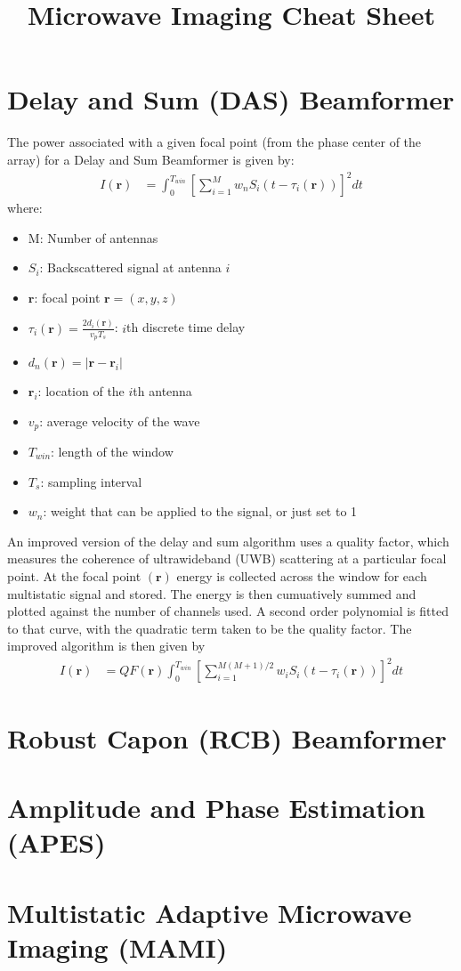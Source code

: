 \documentclass[14pt]{article}
\title{Microwave Imaging Cheat Sheet}
\begin{document}
	\maketitle
		
		\section*{Delay and Sum (DAS) Beamformer}	
			The power associated with a given focal point (from the phase center of 
			the array) for a Delay and Sum Beamformer is given by:
			\begin{align}
				I(\bm{r}) &= \int_0^{T_{win}} [ \sum_{i=1}^M w_n S_i(t - \tau_i(\bm{r}))]^2 dt
			\end{align}
			where:
				\begin{itemize}
					\item	M:	Number of antennas
					\item	$S_i$:	Backscattered signal at antenna $i$
					\item	$\bm{r}$:	focal point $\bm{r} = (x,y,z)$	
					\item	$\tau_i(\bm{r}) = \frac{2d_i(\bm{r})}{v_p T_s}$:	$i$th discrete time delay
					\item	$d_n(\bm{r}) = |\bm{r} - \bm{r}_i|$
					\item	$\bm{r}_i$:	location of the $i$th antenna
					\item	$v_p$:	average velocity of the wave 
					\item	$T_{win}$:	length of the window
					\item	$T_s$:	sampling interval
					\item	$w_n$:	weight that can be applied to the signal, or just set to 1
				\end{itemize}
			
			An improved version of the delay and sum algorithm uses a quality factor,
			which measures the coherence of ultrawideband (UWB) scattering at a 
			particular focal point.  At the focal point $(\bm{r})$ energy is collected
			across the window for each multistatic signal and stored.  The energy is
			then cumuatively summed and plotted against the number of channels used.
			A second order polynomial is fitted to that curve, with the quadratic term
			taken to be the quality factor.  The improved algorithm is then given by
			\begin{align}
				I(\bm{r}) &= QF(\bm{r}) \int_0^{T_{win}} [\sum_{i=1}^{M(M+1)/2} w_i S_i(t - \tau_i(\bm{r}))]^2 dt
			\end{align}
	

		\section*{Robust Capon (RCB) Beamformer}
		\section*{Amplitude and Phase Estimation (APES)}
		\section*{Multistatic Adaptive Microwave Imaging (MAMI)}
	
\end{document}
